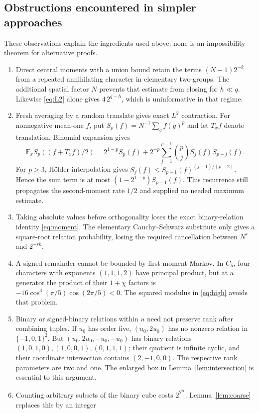 \documentclass[11pt]{amsart}
\theoremstyle{remark}
\newcommand{\E}{\mathbb E}
\begin{document}
\subsection{Obstructions encountered in simpler approaches}
These observations explain the ingredients used above; none is an
impossibility theorem for alternative proofs.
\begin{enumerate}
\item Direct central moments with a union bound retain the terms
$(N-1)2^{-k}$ from a repeated annihilating character in elementary
two-groups. The additional spatial factor $N$ prevents that estimate
from closing for $h\ll q$. Likewise \eqref{eq:L2} alone gives
$4\,2^{q-h}$, which is uninformative in that regime.
\item Fresh averaging by a random translate gives exact $L^2$
contraction. For nonnegative mean-one $f$, put
$S_p(f)=N^{-1}\sum_g f(g)^p$ and let $T_xf$ denote translation.
Binomial expansion gives
\[
 \E_xS_p((f+T_xf)/2)=2^{1-p}S_p(f)
 +2^{-p}\sum_{j=1}^{p-1}\binom pj S_j(f)S_{p-j}(f).
\]
For $p\ge3$, H\"older interpolation gives
$S_j(f)\le S_{p-1}(f)^{(j-1)/(p-2)}$. Hence the sum term is at
most $(1-2^{1-p})S_{p-1}(f)$. This recurrence still propagates the
second-moment rate $1/2$ and supplied no needed maximum estimate.
\item Taking absolute values before orthogonality loses the exact
binary-relation identity \eqref{eq:moment}. The elementary
Cauchy--Schwarz substitute only gives a square-root relation
probability, losing the required cancellation between $N^r$ and
$2^{-rk}$.
\item A signed remainder cannot be bounded by first-moment Markov.
In $C_5$, four characters with exponents $(1,1,1,2)$ have principal
product, but at a generator the product of their $1+\chi$ factors is
$-16\cos^3(\pi/5)\cos(2\pi/5)<0$. The squared modulus in
\eqref{eq:high} avoids that problem.
\item Binary or signed-binary relations within $u$ need not preserve
rank after combining tuples. If $u_0$ has order five, $(u_0,2u_0)$
has no nonzero relation in $\{-1,0,1\}^2$. But
$(u_0,2u_0,-u_0,-u_0)$ has binary relations
$(1,0,1,0),(1,0,0,1),(0,1,1,1)$; their quotient is infinite cyclic,
and their coordinate intersection contains $(2,-1,0,0)$. The
respective rank parameters are two and one. The enlarged box in
Lemma~\ref{lem:intersection} is essential to this argument.
\item Counting arbitrary subsets of the binary cube costs
$2^{2^{2t}}$. Lemma~\ref{lem:coarse} replaces this by an integer

\end{enumerate}
\end{document}
